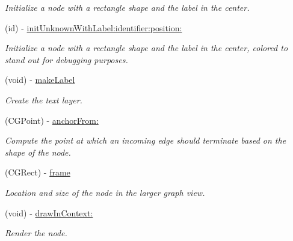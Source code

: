 \begin{Indent}
\begin{DoxyCompactItemize}
\begin{DoxyCompactList}\small\item\em Initialize a node with a rectangle shape and the label in the center. \end{DoxyCompactList}\item 
\hypertarget{interface_p_c_graph_node_a7211068cd92f75dadab3e1fa6799d556}{
(id) -\/ \hyperlink{interface_p_c_graph_node_a7211068cd92f75dadab3e1fa6799d556}{initUnknownWithLabel:identifier:position:}}
\label{interface_p_c_graph_node_a7211068cd92f75dadab3e1fa6799d556}

\begin{DoxyCompactList}\small\item\em Initialize a node with a rectangle shape and the label in the center, colored to stand out for debugging purposes. \end{DoxyCompactList}\item 
\hypertarget{interface_p_c_graph_node_ad1d5969374d1d0e7a1cf04a6eadc520b}{
(void) -\/ \hyperlink{interface_p_c_graph_node_ad1d5969374d1d0e7a1cf04a6eadc520b}{makeLabel}}
\label{interface_p_c_graph_node_ad1d5969374d1d0e7a1cf04a6eadc520b}

\begin{DoxyCompactList}\small\item\em Create the text layer. \end{DoxyCompactList}\item 
\hypertarget{interface_p_c_graph_node_a5c3cade16265de1201a5bf0613435e25}{
(CGPoint) -\/ \hyperlink{interface_p_c_graph_node_a5c3cade16265de1201a5bf0613435e25}{anchorFrom:}}
\label{interface_p_c_graph_node_a5c3cade16265de1201a5bf0613435e25}

\begin{DoxyCompactList}\small\item\em Compute the point at which an incoming edge should terminate based on the shape of the node. \end{DoxyCompactList}\item 
\hypertarget{interface_p_c_graph_node_abcb7c3c6fb32b200c69c1ffe721f25b9}{
(CGRect) -\/ \hyperlink{interface_p_c_graph_node_abcb7c3c6fb32b200c69c1ffe721f25b9}{frame}}
\label{interface_p_c_graph_node_abcb7c3c6fb32b200c69c1ffe721f25b9}

\begin{DoxyCompactList}\small\item\em Location and size of the node in the larger graph view. \end{DoxyCompactList}\item 
\hypertarget{interface_p_c_graph_node_af2b65d32aceb059455f80f4a4146406c}{
(void) -\/ \hyperlink{interface_p_c_graph_node_af2b65d32aceb059455f80f4a4146406c}{drawInContext:}}
\label{interface_p_c_graph_node_af2b65d32aceb059455f80f4a4146406c}

\begin{DoxyCompactList}\small\item\em Render the node. \end{DoxyCompactList}\end{DoxyCompactItemize}
\end{Indent}
